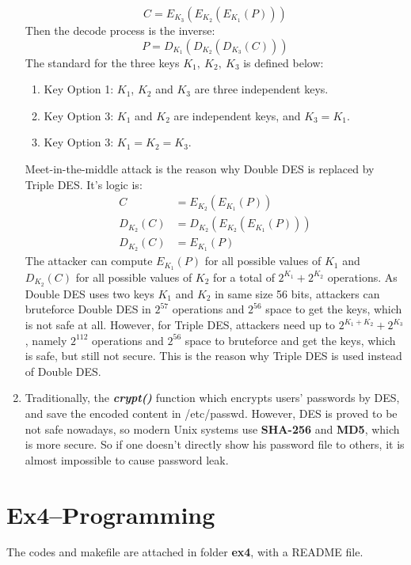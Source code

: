 \documentclass[12pt, a4paper]{article}
\begin{document}
\begin{enumerate}
            $$C = E_{K_3}(E_{K_2}(E_{K_1}(P)))$$
            Then the decode process is the inverse:
            $$P = D_{K_1}(D_{K_2}(D_{K_3}(C)))$$
            The standard for the three keys $K_1,\ K_2,\ K_3$ is defined below:
            \begin{enumerate}[(1)]
                  \item Key Option 1: $K_1$, $K_2$ and $K_3$ are three independent keys.
                  \item Key Option 3: $K_1$ and $K_2$ are independent keys, and $K_3 = K_1$.
                  \item Key Option 3: $K_1 = K_2 = K_3$.
            \end{enumerate}   
            Meet-in-the-middle attack is the reason why Double DES is replaced by Triple DES. It's logic is:
            \begin{align*}
                  C &= E_{K_2}(E_{K_1}(P))\\
                  D_{K_2}(C) &= D_{K_2}(E_{K_2}(E_{K_1}(P)))\\
                  D_{K_2}(C) &= E_{K_1}(P)
            \end{align*}
            The attacker can compute $E_{K_1}(P)$ for all possible values of $K_1$ and $D_{K_2}(C)$ for all 
            possible values of $K_2$ for a total of $2^{K_1} + 2^{K_2}$ operations.\newline
            As Double DES uses two keys $K_1$ and $K_2$ in same size 56 bits, attackers can bruteforce Double DES 
            in $2^{57}$ operations and $2^{56}$ space to get the keys, which is not safe at all.\newline
            However, for Triple DES, attackers need up to $2^{K_1+K_2} + 2^{K_3}$, namely $2^{112}$ operations 
            and $2^{56}$ space to bruteforce and get the keys, which is safe, but still not secure.\newline
            This is the reason why Triple DES is used instead of Double DES.
      \item Traditionally, the \textbf{\emph{crypt()}} function which encrypts users' passwords by DES, 
            and save the encoded content in /etc/passwd. However, DES is proved to be not safe nowadays, 
            so modern Unix systems use \textbf{SHA-256} and \textbf{MD5}, which is more secure. 
            So if one doesn't directly show his password file to others, it is almost impossible to 
            cause password leak.
            
\end{enumerate}

\section{Ex4--Programming}
The codes and makefile are attached in folder \textbf{ex4}, with a README file.
\end{document}
